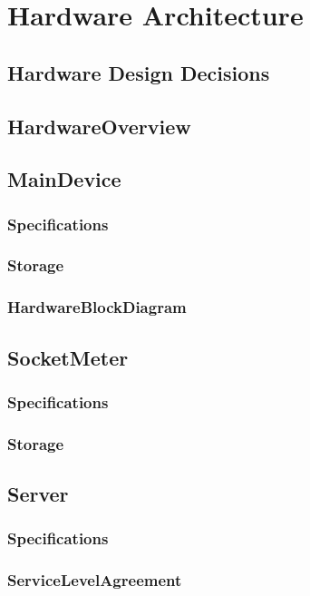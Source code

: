 \chapter{Hardware Architecture}
\label{ch:hardware}

\section{Hardware Design Decisions}

\section{HardwareOverview}

\section{MainDevice}
\subsection{Specifications}
\subsection{Storage}
\subsection{HardwareBlockDiagram}

\section{SocketMeter}
\subsection{Specifications}
\subsection{Storage}

\section{Server}
\subsection{Specifications}
\subsection{ServiceLevelAgreement}
